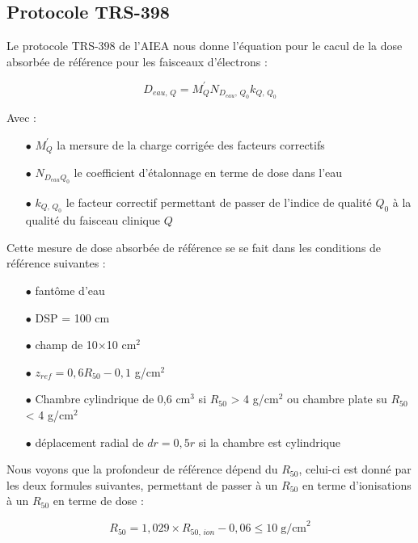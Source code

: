 \documentclass{article}
\begin{document}
\subsection{Protocole TRS-398}
\label{partie_TRS_398}

Le protocole TRS-398 de l'AIEA \cite{international2001iaea} nous donne l'équation pour le cacul de la dose absorbée de référence pour les faisceaux d'électrons :

\begin{equation}
  D_{eau, \, Q} = M_Q^{'} N_{D_{eau}, \, Q_0} k_{Q,\, Q_0}
  \label{eq_dose_398}
\end{equation}

Avec :
\begin{itemize}
  \item[$\bullet$] $M_Q^{'}$ la mersure de la charge corrigée des facteurs correctifs
  \item[$\bullet$] $N_{D_{eau} Q_0}$ le coefficient d'étalonnage en terme de dose dans l'eau
  \item[$\bullet$] $k_{Q,\, Q_0}$ le facteur correctif permettant de passer de l'indice de qualité $Q_0$ à la qualité du faisceau clinique $Q$
\end{itemize}

Cette mesure de dose absorbée de référence se se fait dans les conditions de référence suivantes :

\begin{itemize}
  \item[$\bullet$] fantôme d'eau
  \item[$\bullet$] DSP = 100 cm
  \item[$\bullet$] champ de 10$\times$10 cm$^2$
  \item[$\bullet$] $z_{ref} = 0,6 R_{50} - 0,1$ g/cm$^2$
  \item[$\bullet$] Chambre cylindrique de 0,6 cm$^3$ si $R_{50}$ > 4 g/cm$^2$ ou chambre plate su $R_{50}$ < 4 g/cm$^2$
  \item[$\bullet$] déplacement radial de $dr = 0,5r$ si la chambre est cylindrique
\end{itemize}

Nous voyons que la profondeur de référence dépend du $R_{50}$, celui-ci est donné par les deux formules suivantes, permettant de passer à un $R_{50}$ en terme d'ionisations à un $R_{50}$ en terme de dose :

\begin{equation}
  R_{50} = 1,029 \times R_{50,\, ion} - 0,06 \leq 10\; \text{g/cm}^2
\end{equation}
\end{document}
